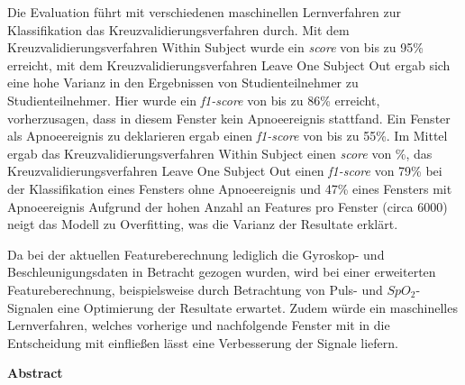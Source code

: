 Die Evaluation führt mit verschiedenen maschinellen Lernverfahren zur Klassifikation das Kreuzvalidierungsverfahren durch.
Mit dem Kreuzvalidierungsverfahren {\glqq Within Subject\grqq} wurde ein \textit{score} von bis zu 95\% erreicht, mit dem Kreuzvalidierungsverfahren {\glqq Leave One Subject Out\grqq} ergab sich eine hohe Varianz in den Ergebnissen von Studienteilnehmer zu Studienteilnehmer.
Hier wurde ein \textit{f1-score} von bis zu 86\% erreicht, vorherzusagen, dass in diesem Fenster kein Apnoeereignis stattfand. 
Ein Fenster als Apnoeereignis zu deklarieren ergab einen \textit{f1-score} von bis zu 55\%. \newline
Im Mittel ergab das Kreuzvalidierungsverfahren {\glqq Within Subject\grqq} einen \textit{score} von \%, das Kreuzvalidierungsverfahren {\glqq Leave One Subject Out\grqq} einen \textit{f1-score} von 79\% bei der Klassifikation eines Fensters ohne Apnoeereignis und 47\% eines Fensters mit Apnoeereignis
Aufgrund der hohen Anzahl an Features pro Fenster (circa 6000) neigt das Modell zu Overfitting, was die Varianz der Resultate erklärt.

Da bei der aktuellen Featureberechnung lediglich die Gyroskop- und Beschleunigungsdaten in Betracht gezogen wurden, wird bei einer erweiterten Featureberechnung, beispielsweise      durch Betrachtung von Puls- und $SpO_2$-Signalen eine Optimierung der Resultate erwartet.
Zudem würde ein maschinelles Lernverfahren, welches vorherige und nachfolgende Fenster mit in die Entscheidung mit einfließen lässt eine Verbesserung der Signale liefern.



\cleardoublepage
\vspace*{1em}
\begin{center}
	\textbf{Abstract}
\end{center}

\cleardoublepage